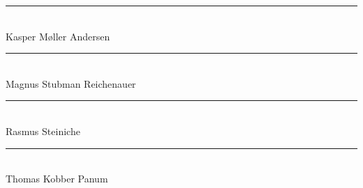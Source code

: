 \newpage
\parbox{10px}{}
\vfill


\begin{flushright}
	\rule[-0.1cm]{7cm}{0.01cm}\\
	Kasper M\o{}ller Andersen \\
\end{flushright}

\begin{flushright}
	\rule[-0.1cm]{7cm}{0.01cm}\\
	Magnus Stubman Reichenauer \\
\end{flushright}

\begin{flushright}
	\rule[-0.1cm]{7cm}{0.01cm}\\
	Rasmus Steiniche \\
\end{flushright}

\begin{flushright}
	\rule[-0.1cm]{7cm}{0.01cm}\\
	Thomas Kobber Panum\\
\end{flushright}
